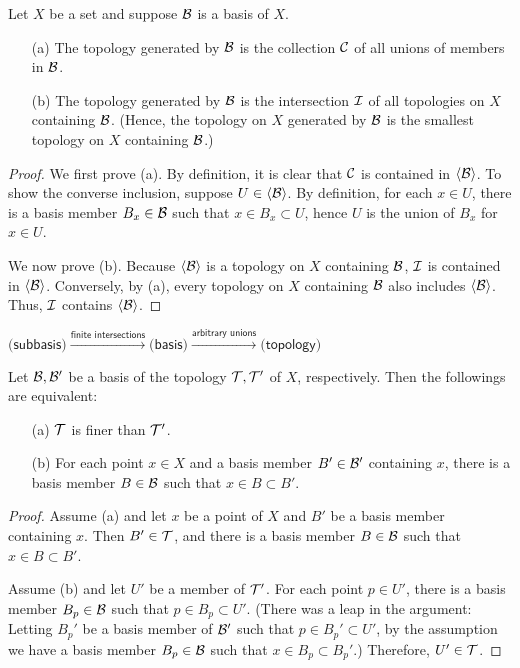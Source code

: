 \begin{obs}
    Let $X$ be a set and suppose ${\mathcal{B}}$ is a basis of $X$.
    \begin{enumerate}
        \item[(a)]
        {
            The topology generated by ${\mathcal{B}}$ is the collection ${\mathcal{C}}$ of all unions of members in ${\mathcal{B}}$.
        }
        \item[(b)]
        {
            The topology generated by ${\mathcal{B}}$ is the intersection ${\mathcal{I}}$ of all topologies on $X$ containing ${\mathcal{B}}$. (Hence, the topology on $X$ generated by ${\mathcal{B}}$ is the smallest topology on $X$ containing ${\mathcal{B}}$.)
        }
    \end{enumerate}
\end{obs}
\begin{proof}
    We first prove (a).
    By definition, it is clear that ${\mathcal{C}}$ is contained in ${\left\langle{{\mathcal{B}}}\right\rangle}$.
    To show the converse inclusion, suppose $U\in{\left\langle{{\mathcal{B}}}\right\rangle}$.
    By definition, for each $x\in U$, there is a basis member $B_x\in{\mathcal{B}}$ such that $x\in B_x\subset U$, hence $U$ is the union of $B_x$ for $x\in U$.

    We now prove (b).
    Because ${\left\langle{{\mathcal{B}}}\right\rangle}$ is a topology on $X$ containing ${\mathcal{B}}$, ${\mathcal{I}}$ is contained in ${\left\langle{{\mathcal{B}}}\right\rangle}$.
    Conversely, by (a), every topology on $X$ containing ${\mathcal{B}}$ also includes ${\left\langle{{\mathcal{B}}}\right\rangle}$.
    Thus, ${\mathcal{I}}$ contains ${\left\langle{{\mathcal{B}}}\right\rangle}$.
\end{proof}

\begin{rmk}
    $
        \textsf{(subbasis)}\xrightarrow{\textsf{finite intersections}}
        \textsf{(basis)}\xrightarrow{\textsf{arbitrary unions}}
        \textsf{(topology)}
    $
\end{rmk}

\begin{lem}
    Let ${\mathcal{B}}, {\mathcal{B}}'$ be a basis of the topology ${\mathcal{T}}, {\mathcal{T}}'$ of $X$, respectively.
    Then the followings are equivalent:
    \begin{enumerate}
        \item[(a)]
        {
            ${\mathcal{T}}$ is finer than ${\mathcal{T}}'$.
        }
        \item[(b)]
        {
            For each point $x\in X$ and a basis member $B'\in{\mathcal{B}}'$ containing $x$, there is a basis member $B\in{\mathcal{B}}$ such that $x\in B\subset B'$.
        }
    \end{enumerate}
\end{lem}
\begin{proof}
    Assume (a) and let $x$ be a point of $X$ and $B'$ be a basis member containing $x$.
    Then $B'\in{\mathcal{T}}$, and there is a basis member $B\in{\mathcal{B}}$ such that $x\in B\subset B'$.

    Assume (b) and let $U'$ be a member of ${\mathcal{T}}'$.
    For each point $p\in U'$, there is a basis member $B_p\in{\mathcal{B}}$ such that $p\in B_p\subset U'$.
    (There was a leap in the argument: Letting $B_p'$ be a basis member of ${\mathcal{B}}'$ such that $p\in B_p'\subset U'$, by the assumption we have a basis member $B_p\in{\mathcal{B}}$ such that $x\in B_p\subset B_p'$.)
    Therefore, $U'\in{\mathcal{T}}$.
\end{proof}
